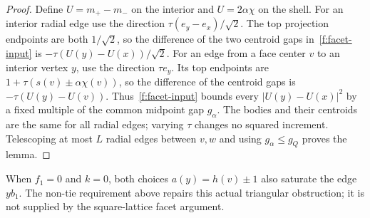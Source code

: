 \begin{proof}
Define $U=m_+-m_-$ on the interior and $U=2\alpha\chi$ on the shell.
For an interior radial edge use the direction
$\tau(e_y-e_x)/\sqrt2$. The top projection endpoints are both $1/\sqrt2$,
so the difference of the two centroid gaps in~\eqref{f:facet-input} is
$-\tau(U(y)-U(x))/\sqrt2$. For an edge from a face center $v$ to an
interior vertex $y$, use the direction $\tau e_y$. Its top endpoints are
$1+\tau(s(v)\pm\alpha\chi(v))$, so the difference of the centroid gaps
is $-\tau(U(y)-U(v))$. Thus~\eqref{f:facet-input} bounds every
$|U(y)-U(x)|^2$ by a fixed multiple of the common midpoint gap $g_\alpha$.
The bodies and their centroids are the same for all radial edges; varying
$\tau$ changes no squared increment. Telescoping at most $L$ radial edges
between $v,w$ and using $g_\alpha\le g_Q$ proves the lemma.
\end{proof}

When $f_1=0$ and $k=0$, both choices $a(y)=h(v)\pm1$ also saturate the
edge $yb_1$. The non-tie requirement above repairs this actual triangular
obstruction; it is not supplied by the square-lattice facet argument.

